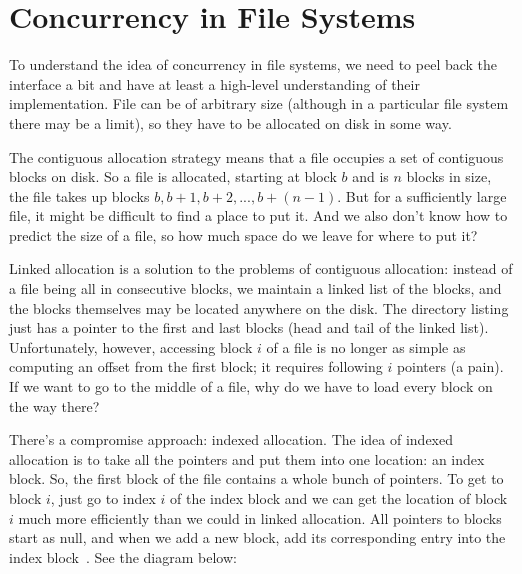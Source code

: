 




\section*{Concurrency in File Systems}

To understand the idea of concurrency in file systems, we need to peel back the interface a bit and have at least a high-level understanding of their implementation. File can be of arbitrary size (although in a particular file system there may be a limit), so they have to be allocated on disk in some way.

The contiguous allocation strategy means that a file occupies a set of contiguous blocks on disk. So a file is allocated, starting at block $b$ and is $n$ blocks in size, the file takes up blocks $b, b+1, b+2, ..., b+(n-1)$. But for a sufficiently large file, it might be difficult to find a place to put it. And we also don't know how to predict the size of a file, so how much space do we leave for where to put it?

Linked allocation is a solution to the problems of contiguous allocation: instead of a file being all in consecutive blocks, we maintain a linked list of the blocks, and the blocks themselves may be located anywhere on the disk. The directory listing just has a pointer to the first and last blocks (head and tail of the linked list). Unfortunately, however, accessing block $i$ of a file is no longer as simple as computing an offset from the first block; it requires following $i$ pointers (a pain). If we want to go to the middle of a file, why do we have to load every block on the way there?

There's a compromise approach: indexed allocation. The idea of indexed allocation is to take all the pointers and put them into one location: an index block. So, the first block of the file contains a whole bunch of pointers. To get to block $i$, just go to index $i$ of the index block and we can get the location of block $i$ much more efficiently than we could in linked allocation. All pointers to blocks start as null, and when we add a new block, add its corresponding entry into the index block~\cite{osc}. See the diagram below:

